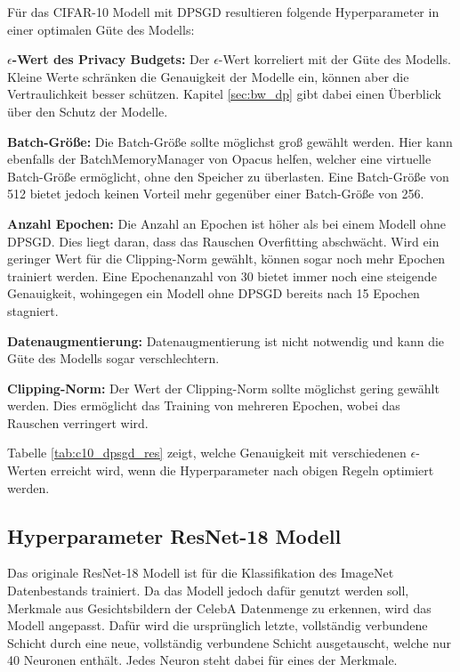 Für das CIFAR-10 Modell mit DPSGD resultieren folgende Hyperparameter in einer optimalen Güte des Modells:
\begin{compactitem}
    \item \textbf{$\epsilon$-Wert des Privacy Budgets:} Der $\epsilon$-Wert korreliert mit der Güte des Modells. Kleine Werte schränken die Genauigkeit der Modelle ein, können aber die Vertraulichkeit besser schützen. Kapitel \ref{sec:bw_dp} gibt dabei einen Überblick über den Schutz der Modelle.
    \item \textbf{Batch-Größe:} Die Batch-Größe sollte möglichst groß gewählt werden. Hier kann ebenfalls der BatchMemoryManager von Opacus helfen, welcher eine virtuelle Batch-Größe ermöglicht, ohne den Speicher zu überlasten. Eine Batch-Größe von 512 bietet jedoch keinen Vorteil mehr gegenüber einer Batch-Größe von 256.
    \item \textbf{Anzahl Epochen:} Die Anzahl an Epochen ist höher als bei einem Modell ohne DPSGD. 
    Dies liegt daran, dass das Rauschen Overfitting abschwächt. Wird ein geringer Wert für die Clipping-Norm gewählt, können sogar noch mehr Epochen trainiert werden.
    Eine Epochenanzahl von 30 bietet immer noch eine steigende Genauigkeit, wohingegen ein Modell ohne DPSGD bereits nach 15 Epochen stagniert.
    \item \textbf{Datenaugmentierung:} Datenaugmentierung ist nicht notwendig und kann die Güte des Modells sogar verschlechtern.
    \item \textbf{Clipping-Norm:} Der Wert der Clipping-Norm sollte möglichst gering gewählt werden. Dies ermöglicht das Training von mehreren Epochen, wobei das Rauschen verringert wird.
\end{compactitem}

Tabelle \ref{tab:c10_dpsgd_res} zeigt, welche Genauigkeit mit verschiedenen $\epsilon$-Werten erreicht wird, wenn die Hyperparameter nach obigen Regeln optimiert werden.


\subsection{Hyperparameter ResNet-18 Modell}

Das originale ResNet-18 Modell ist für die Klassifikation des ImageNet Datenbestands trainiert. 
Da das Modell jedoch dafür genutzt werden soll, Merkmale aus Gesichtsbildern der CelebA Datenmenge zu erkennen, wird das Modell angepasst.
Dafür wird die ursprünglich letzte, vollständig verbundene Schicht durch eine neue, vollständig verbundene Schicht ausgetauscht, welche nur 40 Neuronen enthält.
Jedes Neuron steht dabei für eines der Merkmale.


